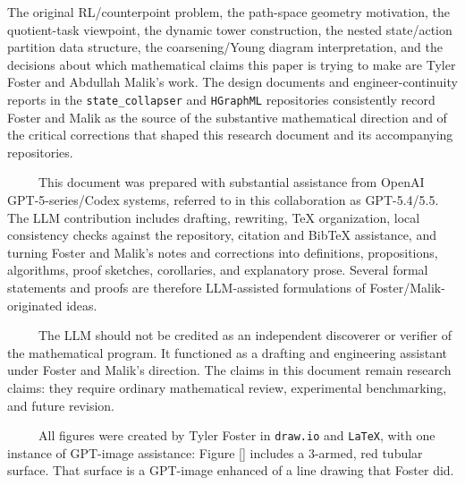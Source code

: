 \documentclass[11pt]{article}
\begin{document}
\begin{center}
\begin{minipage}{0.875\linewidth}
\small
{}
The original RL/counterpoint problem, the path-space geometry motivation, the quotient-task viewpoint, the dynamic tower construction, the nested state/action partition data structure, the coarsening/Young diagram interpretation, and the decisions about which mathematical claims this paper is trying to make are Tyler Foster and Abdullah Malik's work. The design documents and engineer-continuity reports in the \texttt{state\_collapser} and \texttt{HGraphML} repositories consistently record Foster and Malik as the source of the substantive mathematical direction and of the critical corrections that shaped this research document and its accompanying repositories.

\ \ \ \ \ This document was prepared with substantial assistance from OpenAI GPT-5-series/Codex systems, referred to in this collaboration as GPT-5.4/5.5. The LLM contribution includes drafting, rewriting, TeX organization, local consistency checks against the repository, citation and BibTeX assistance, and turning Foster and Malik's notes and corrections into definitions, propositions, algorithms, proof sketches, corollaries, and explanatory prose. Several formal statements and proofs are therefore LLM-assisted formulations of Foster/Malik-originated ideas.

\ \ \ \ \ The LLM should not be credited as an independent discoverer or verifier of the mathematical program. It functioned as a drafting and engineering assistant under Foster and Malik's direction. The claims in this document remain research claims: they require ordinary mathematical review, experimental benchmarking, and future revision.

\ \ \ \ \ All figures were created by Tyler Foster in \texttt{draw.io} and \texttt{LaTeX}, with one instance of GPT-image assistance: Figure \ref{} includes a $3$-armed, red tubular surface. That surface is a GPT-image enhanced of a line drawing that Foster did.
\end{minipage}
\end{center}
\newpage


\setcounter{tocdepth}{1}
\tableofcontents
\end{document}
